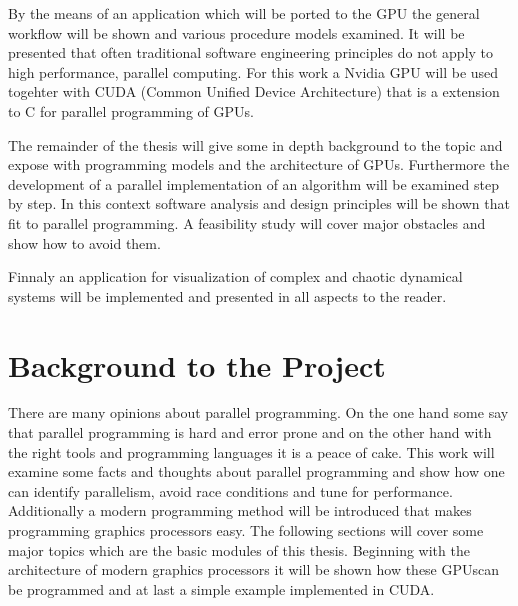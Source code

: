 By the means of an application which will be ported to the \gls{GPU} the general
workflow will be shown and various procedure models examined. It will be
presented that often traditional software engineering principles do not
apply to high performance, parallel computing. For this work a Nvidia \gls{GPU} will
be used togehter with \gls{CUDA} (Common Unified Device Architecture) that is a
extension to C for parallel programming of GPUs. 

The remainder of the thesis will give some in depth background to the topic and
expose with programming models and the architecture of GPUs. Furthermore the
development of a parallel implementation of an algorithm will be examined step
by step. In this context software analysis and design principles will be shown
that fit to parallel programming. A feasibility study will cover major obstacles
and show how to avoid them.

Finnaly an application for visualization of complex and chaotic dynamical
systems will be implemented and presented in all aspects to the reader.
\section*{Background to the Project} 
\label{sub:background_to_the_project} 
There are many opinions about parallel programming. On the one hand some say
that parallel programming is hard and error prone and on the other hand with the
right tools and programming languages it is a peace of cake. This work will
examine some facts and thoughts about parallel programming and show how one can
identify parallelism, avoid race conditions and tune for performance.
Additionally a modern programming method will be introduced that makes
programming graphics processors easy. The following sections will cover some
major topics which are the basic modules of this thesis. Beginning with the
architecture of modern graphics processors it will be shown how these \glspl{GPU}can
be programmed and at last a simple example implemented in CUDA. 


